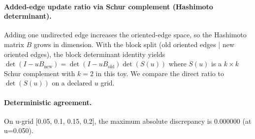 \paragraph{Added-edge update ratio via Schur complement (Hashimoto determinant).} \AuditTag Adding one undirected edge increases the oriented-edge space, so the Hashimoto matrix $B$ grows in dimension. With the block split (old oriented edges | new oriented edges), the block determinant identity yields $\det(I-uB_{\mathrm{new}})=\det(I-uB_{\mathrm{old}})\det(S(u))$ where $S(u)$ is a $k\times k$ Schur complement with $k=2$ in this toy. We compare the direct ratio to $\det(S(u))$ on a declared $u$ grid.
\paragraph{Deterministic agreement.} \AuditTag On u-grid [0.05, 0.1, 0.15, 0.2], the maximum absolute discrepancy is 0.000000 (at u=0.050).